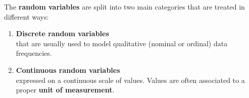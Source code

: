 \begin{frame}
  \vspace*{.25cm}
  The \textbf{random variables} are split into two main categories that are treated in different ways:
  \vspace*{.25cm}
  \begin{enumerate}
    \item \textbf{Discrete random variables} \\
    that are usually used to model qualitative (nominal or ordinal) data frequencies.
    \vspace*{.25cm}
    \item \textbf{Continuous random variables} \\
      expressed on a continuous scale of values. Values are often associated to a proper \textbf{unit of measurement}.\\
  \end{enumerate}
\end{frame}


